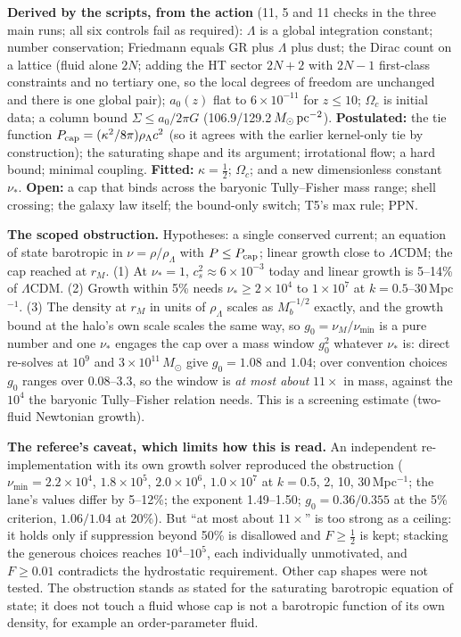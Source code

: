 \documentclass[10pt]{article}
\begin{document}
\textbf{Derived by the scripts, from the action} (11, 5 and 11 checks in the three main runs; all six controls fail as required): $\Lambda$ is a global integration constant; number conservation; Friedmann equals GR plus $\Lambda$ plus dust; the Dirac count on a lattice (fluid alone $2N$; adding the HT sector $2N+2$ with $2N-1$ first-class constraints and no tertiary one, so the local degrees of freedom are unchanged and there is one global pair); $a_0(z)$ flat to $6\times10^{-11}$ for $z\le10$; $\Omega_c$ is initial data; a column bound $\Sigma\le a_0/2\pi G$ (106.9/129.2\,$M_\odot\,{\rm pc}^{-2}$).
\textbf{Postulated:} the tie function $P_{\rm cap}=(\kappa^2/8\pi)\rho_\Lambda c^2$ (so it agrees with the earlier kernel-only tie by construction); the saturating shape and its argument; irrotational flow; a hard bound; minimal coupling. \textbf{Fitted:} $\kappa=\tfrac12$; $\Omega_c$; and a new dimensionless constant $\nu_*$. \textbf{Open:} a cap that binds across the baryonic Tully--Fisher mass range; shell crossing; the galaxy law itself; the bound-only switch; T5's max rule; PPN.

\textbf{The scoped obstruction.} Hypotheses: a single conserved current; an equation of state barotropic in $\nu=\rho/\rho_\Lambda$ with $P\le P_{\rm cap}$; linear growth close to $\Lambda$CDM; the cap reached at $r_M$. (1) At $\nu_*=1$, $c_s^2\approx6\times10^{-3}$ today and linear growth is 5--14\% of $\Lambda$CDM. (2) Growth within 5\% needs $\nu_*\ge2\times10^4$ to $1\times10^7$ at $k=0.5$--30\,Mpc$^{-1}$. (3) The density at $r_M$ in units of $\rho_\Lambda$ scales as $M_b^{-1/2}$ exactly, and the growth bound at the halo's own scale scales the same way, so $g_0=\nu_M/\nu_{\min}$ is a pure number and one $\nu_*$ engages the cap over a mass window $g_0^2$ whatever $\nu_*$ is: direct re-solves at $10^9$ and $3\times10^{11}\,M_\odot$ give $g_0=1.08$ and $1.04$; over convention choices $g_0$ ranges over 0.08--3.3, so the window is \emph{at most about} $11\times$ in mass, against the $10^4$ the baryonic Tully--Fisher relation needs. This is a screening estimate (two-fluid Newtonian growth).

\textbf{The referee's caveat, which limits how this is read.} An independent re-implementation with its own growth solver reproduced the obstruction ($\nu_{\min}=2.2\times10^4$, $1.8\times10^5$, $2.0\times10^6$, $1.0\times10^7$ at $k=0.5$, 2, 10, 30\,Mpc$^{-1}$; the lane's values differ by 5--12\%; the exponent 1.49--1.50; $g_0=0.36/0.355$ at the 5\% criterion, $1.06/1.04$ at 20\%). But ``at most about $11\times$'' is too strong as a ceiling: it holds only if suppression beyond 50\% is disallowed and $F\ge\tfrac12$ is kept; stacking the generous choices reaches $10^4$--$10^5$, each individually unmotivated, and $F\ge0.01$ contradicts the hydrostatic requirement. Other cap shapes were not tested. The obstruction stands as stated for the saturating barotropic equation of state; it does not touch a fluid whose cap is not a barotropic function of its own density, for example an order-parameter fluid.
\end{document}
